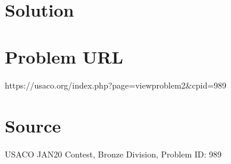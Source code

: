 \documentclass[12pt]{article}
\begin{document}
\section*{Solution}


\section*{Problem URL}
https://usaco.org/index.php?page=viewproblem2&cpid=989

\section*{Source}
USACO JAN20 Contest, Bronze Division, Problem ID: 989
\end{document}
